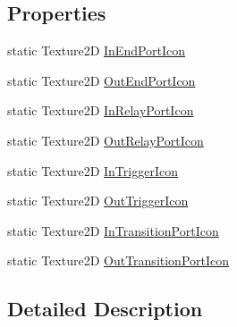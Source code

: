 \subsection*{Properties}
\begin{DoxyCompactItemize}
\item 
static Texture2\+D \hyperlink{classi_c_s___builtin_textures_a227fb7d2d724d7bdcb4554dc76229c8b}{In\+End\+Port\+Icon}
\item 
static Texture2\+D \hyperlink{classi_c_s___builtin_textures_a2e47fb67d846995227f092b9fac02ff4}{Out\+End\+Port\+Icon}
\item 
static Texture2\+D \hyperlink{classi_c_s___builtin_textures_a54a50ba9927b768c1dfd3c6316bafa8d}{In\+Relay\+Port\+Icon}
\item 
static Texture2\+D \hyperlink{classi_c_s___builtin_textures_a244c3b7279bd16ac34e4704842f3398e}{Out\+Relay\+Port\+Icon}
\item 
static Texture2\+D \hyperlink{classi_c_s___builtin_textures_a8d0d47bcb018078d75cd70f7e9920d5a}{In\+Trigger\+Icon}
\item 
static Texture2\+D \hyperlink{classi_c_s___builtin_textures_a98e61b571af6c6e7a4128cf086d42c6e}{Out\+Trigger\+Icon}
\item 
static Texture2\+D \hyperlink{classi_c_s___builtin_textures_a7e4b82d7c83d3d4107e558bb2aadde91}{In\+Transition\+Port\+Icon}
\item 
static Texture2\+D \hyperlink{classi_c_s___builtin_textures_a06b2f56eb61c2851c43d05e42ec68bd1}{Out\+Transition\+Port\+Icon}
\end{DoxyCompactItemize}


\subsection{Detailed Description}


